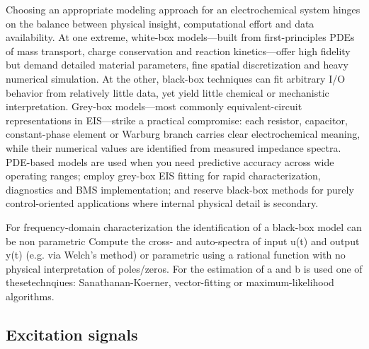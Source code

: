Choosing an appropriate modeling approach for an electrochemical system hinges on the balance between physical insight, computational effort and data availability.  At one extreme, white-box models—built from first-principles PDEs of mass transport, charge conservation and reaction kinetics—offer high fidelity but demand detailed material parameters, fine spatial discretization and heavy numerical simulation.  At the other, black-box techniques can fit arbitrary I/O behavior from relatively little data, yet yield little chemical or mechanistic interpretation.  Grey-box models—most commonly equivalent-circuit representations in EIS—strike a practical compromise: each resistor, capacitor, constant-phase element or Warburg branch carries clear electrochemical meaning, while their numerical values are identified from measured impedance spectra.  PDE-based models are used when you need predictive accuracy across wide operating ranges; employ grey-box EIS fitting for rapid characterization, diagnostics and BMS implementation; and reserve black-box methods for purely control-oriented applications where internal physical detail is secondary.

For frequency-domain characterization the identification of a black-box model can be non parametric Compute the cross- and auto-spectra of input u(t) and output y(t) (e.g. via Welch's method) or parametric using a rational function with no physical interpretation of poles/zeros. For the estimation of a and b is used one of thesetechnqiues:  Sanathanan-Koerner, vector-fitting or maximum-likelihood algorithms.

\subsection{Excitation signals}

